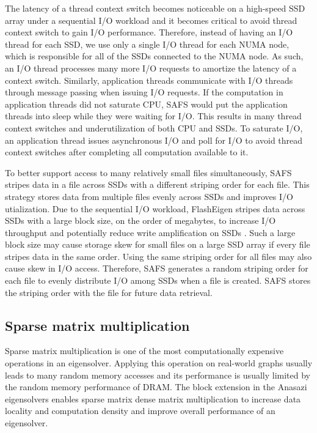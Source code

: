The latency of a thread context switch becomes noticeable on a high-speed SSD
array under a sequential I/O workload and it becomes critical to avoid thread
context switch to gain I/O performance. Therefore, instead of having an I/O
thread for each SSD, we use only a single I/O thread for each NUMA node, which
is responsible for all of the SSDs connected to the NUMA node. As such, an I/O
thread processes many more I/O requests to amortize the latency of a context
switch. Similarly, application threads communicate with I/O threads through
message passing when issuing I/O requests. If the computation in application
threads did not saturate CPU, SAFS would put the application threads into
sleep while they were waiting for I/O. This results in many thread context
switches and underutilization of both CPU and SSDs. To saturate I/O,
an application thread issues asynchronous I/O and poll for I/O to avoid thread
context switches after completing all computation available to it.

To better support access to many relatively small files simultaneously, SAFS
stripes data in a file across SSDs with a different striping order for each file.
This strategy stores data from multiple files evenly across SSDs and improves
I/O utialization. Due to the sequential I/O workload, FlashEigen stripes data
across SSDs with a large block size, on the order of megabytes, to increase I/O
throughput and potentially reduce write amplification on SSDs \cite{Tang15}.
Such a large block size may cause storage skew for small files
on a large SSD array if every file stripes data in the same order. Using
the same striping order for all files may also cause skew in I/O access.
Therefore, SAFS generates a random striping order for each file to evenly
distribute I/O among SSDs when a file is created. SAFS stores the striping
order with the file for future data retrieval.

\subsection{Sparse matrix multiplication} \label{spmm}
Sparse matrix multiplication is one of the most computationally expensive
operations in an eigensolver. Applying this operation on real-world graphs
usually leads to many random memory accesses and its performance is usually
limited by the random memory performance of DRAM. The block extension
in the Anasazi eigensolvers enables sparse matrix dense matrix multiplication
to increase data locality and computation density and improve overall performance
of an eigensolver.

